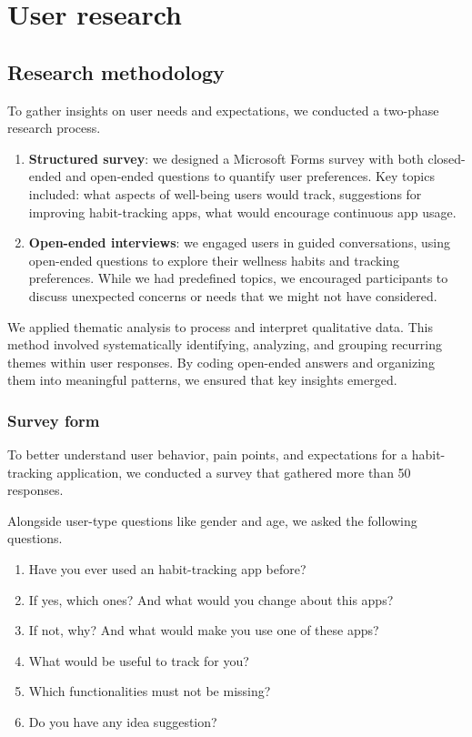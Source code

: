 \documentclass{article}
\begin{document}
\section{User research}

\subsection{Research methodology}

To gather insights on user needs and expectations, we conducted a two-phase research process.

\begin{enumerate}
	\item \textbf{Structured survey}: we designed a Microsoft Forms survey with both closed-ended and open-ended questions to quantify user preferences. Key topics included: what aspects of well-being users would track, suggestions for improving habit-tracking apps, what would encourage continuous app usage.
	\item \textbf{Open-ended interviews}: we engaged users in guided conversations, using open-ended questions to explore their wellness habits and tracking preferences. While we had predefined topics, we encouraged participants to discuss unexpected concerns or needs that we might not have considered.
\end{enumerate}

We applied thematic analysis to process and interpret qualitative data.
This method involved systematically identifying, analyzing, and grouping recurring themes within user responses.
By coding open-ended answers and organizing them into meaningful patterns, we ensured that key insights emerged.

\subsubsection{Survey form}

To better understand user behavior, pain points, and expectations for a habit-tracking application, we conducted a survey that gathered more than 50 responses.

Alongside user-type questions like gender and age, we asked the following questions.

\begin{enumerate}
	\item Have you ever used an habit-tracking app before?
	\item If yes, which ones? And what would you change about this apps?
	\item If not, why? And what would make you use one of these apps?
	\item What would be useful to track for you?
	\item Which functionalities must not be missing?
	\item Do you have any idea suggestion?
\end{enumerate}
\end{document}
